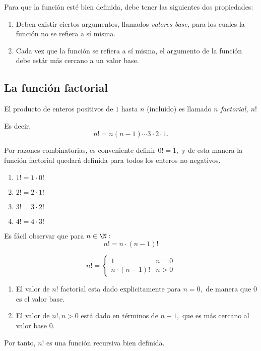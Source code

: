 	Para que la función est\'e bien definida, debe tener las siguientes dos propiedades:
	\begin{enumerate}
		\item Deben existir ciertos argumentos, llamados \emph{valores base,} para los cuales la función no se refiera a sí misma.
		\item Cada vez que la función se refiera a sí misma, el argumento de la función debe estár más cercano a un valor base.
	\end{enumerate}
	


\subsection{La función factorial}


	El producto de enteros positivos de $1$ hasta $n$ (incluído) es llamado \emph{$n$ factorial, $n!$}
	
	Es decir, 
	$$
	n!=n(n-1)\cdots 3\cdot 2 \cdot 1.$$
	



	Por razones combinatorias, es conveniente definir \emph{$0!=1,$} y de esta manera la función factorial quedará definida para todos los enteros no negativos.



	\begin{observacion}
		\begin{enumerate}
			\item $1!=1\cdot0!$
			\item $2!=2\cdot1!$
			\item $3!=3\cdot2!$
			\item $4!=4\cdot3!$
		\end{enumerate}
		
	\end{observacion}
	



	Es fácil observar que para $n \in \N:$
	$$
	n!=n\cdot (n-1)!
	$$



	\begin{definicion}
		$$n!=
		\begin{cases}
			1 & n=0 \\
			n\cdot(n-1)! & n>0
		\end{cases}
		$$
	\end{definicion}
	



	\begin{observacion}
		\begin{enumerate}
			\item El valor de $n!$ factorial esta dado explicitamente para $n=0,$ de manera que $0$ es el valor base. 
			\item El valor de $n!, n>0$ está dado en t\'erminos de $n-1,$ que es más cercano al valor base $0.$    
		\end{enumerate}
		
		Por tanto, $n!$ es una función recursiva bien definida.
	\end{observacion}
	


